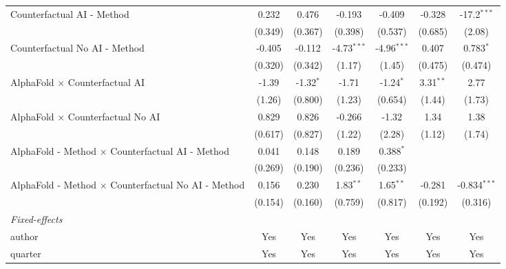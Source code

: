 \begin{tabular}{lcccccc}
   Counterfactual AI - Method                                 & 0.232   & 0.476       & -0.193        & -0.409        & -0.328      & -17.2$^{***}$\\   
                                                              & (0.349) & (0.367)     & (0.398)       & (0.537)       & (0.685)     & (2.08)\\   
   Counterfactual No AI - Method                              & -0.405  & -0.112      & -4.73$^{***}$ & -4.96$^{***}$ & 0.407       & 0.783$^{*}$\\   
                                                              & (0.320) & (0.342)     & (1.17)        & (1.45)        & (0.475)     & (0.474)\\   
   AlphaFold $\times$ Counterfactual AI                       & -1.39   & -1.32$^{*}$ & -1.71         & -1.24$^{*}$   & 3.31$^{**}$ & 2.77\\   
                                                              & (1.26)  & (0.800)     & (1.23)        & (0.654)       & (1.44)      & (1.73)\\   
   AlphaFold $\times$ Counterfactual No AI                    & 0.829   & 0.826       & -0.266        & -1.32         & 1.34        & 1.38\\   
                                                              & (0.617) & (0.827)     & (1.22)        & (2.28)        & (1.12)      & (1.74)\\   
   AlphaFold - Method $\times$ Counterfactual AI - Method     & 0.041   & 0.148       & 0.189         & 0.388$^{*}$   &             &   \\   
                                                              & (0.269) & (0.190)     & (0.236)       & (0.233)       &             &   \\   
   AlphaFold - Method $\times$ Counterfactual No AI - Method  & 0.156   & 0.230       & 1.83$^{**}$   & 1.65$^{**}$   & -0.281      & -0.834$^{***}$\\   
                                                              & (0.154) & (0.160)     & (0.759)       & (0.817)       & (0.192)     & (0.316)\\   
   \midrule
   \emph{Fixed-effects}\\
   author                                                     & Yes     & Yes         & Yes           & Yes           & Yes         & Yes\\  
   quarter                                                    & Yes     & Yes         & Yes           & Yes           & Yes         & Yes\\  

\end{tabular}
